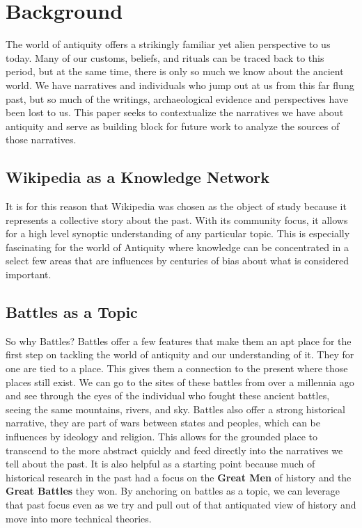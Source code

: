 \documentclass[
  letterpaper,
  DIV=11,
  numbers=noendperiod]{scrartcl}
\begin{document}
\section{Background}\label{background}

The world of antiquity offers a strikingly familiar yet alien
perspective to us today. Many of our customs, beliefs, and rituals can
be traced back to this period, but at the same time, there is only so
much we know about the ancient world. We have narratives and individuals
who jump out at us from this far flung past, but so much of the
writings, archaeological evidence and perspectives have been lost to us.
This paper seeks to contextualize the narratives we have about antiquity
and serve as building block for future work to analyze the sources of
those narratives.

\subsection{Wikipedia as a Knowledge
Network}\label{wikipedia-as-a-knowledge-network}

It is for this reason that Wikipedia was chosen as the object of study
because it represents a collective story about the past. With its
community focus, it allows for a high level synoptic understanding of
any particular topic. This is especially fascinating for the world of
Antiquity where knowledge can be concentrated in a select few areas that
are influences by centuries of bias about what is considered important.

\subsection{Battles as a Topic}\label{battles-as-a-topic}

So why Battles? Battles offer a few features that make them an apt place
for the first step on tackling the world of antiquity and our
understanding of it. They for one are tied to a place. This gives them a
connection to the present where those places still exist. We can go to
the sites of these battles from over a millennia ago and see through the
eyes of the individual who fought these ancient battles, seeing the same
mountains, rivers, and sky. Battles also offer a strong historical
narrative, they are part of wars between states and peoples, which can
be influences by ideology and religion. This allows for the grounded
place to transcend to the more abstract quickly and feed directly into
the narratives we tell about the past. It is also helpful as a starting
point because much of historical research in the past had a focus on the
\textbf{Great Men} of history and the \textbf{Great Battles} they won.
By anchoring on battles as a topic, we can leverage that past focus even
as we try and pull out of that antiquated view of history and move into
more technical theories.
\end{document}
